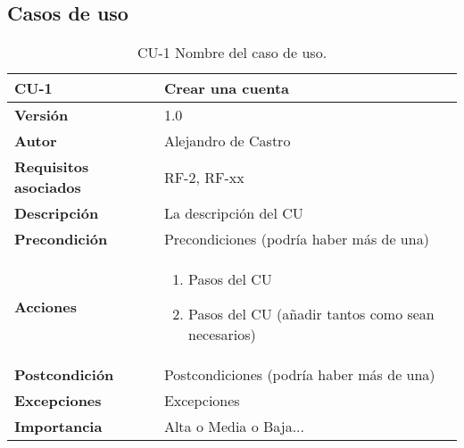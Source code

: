 \subsection{Casos de uso}
\begin{table}[p]
	\centering
	\begin{tabularx}{\linewidth}{ p{} p{} }
		\toprule
		\textbf{CU-1}    & \textbf{Crear una cuenta}\\
		\toprule
		\textbf{Versión}              & 1.0    \\
		\textbf{Autor}                & {Alejandro de Castro} \\
		\textbf{Requisitos asociados} & RF-2, RF-xx \\
		\textbf{Descripción}          & La descripción del CU \\
		\textbf{Precondición}         & Precondiciones (podría haber más de una) \\
		\textbf{Acciones}             &
		\begin{enumerate}
			\def\labelenumi{\arabic{enumi}.}
			\tightlist
			\item Pasos del CU
			\item Pasos del CU (añadir tantos como sean necesarios)
		\end{enumerate}\\
		\textbf{Postcondición}        & Postcondiciones (podría haber más de una) \\
		\textbf{Excepciones}          & Excepciones \\
		\textbf{Importancia}          & Alta o Media o Baja... \\
		\bottomrule
	\end{tabularx}
	\caption{CU-1 Nombre del caso de uso.}
\end{table}



